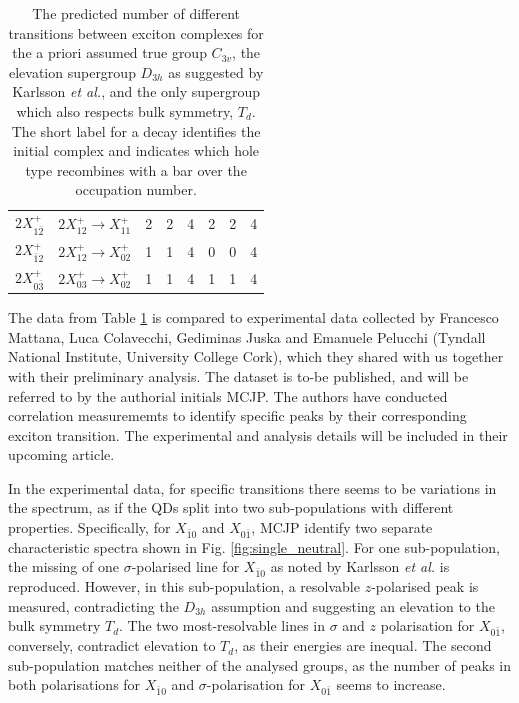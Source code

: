 \begin{table}
\begin{center}
\begin{tabular}{c c | c c c | c c c}
 $2X^+_{1\bar{2}}$ & $2X^+_{12}\to X^+_{11}$ & 2 & 2 & 4 & 2 & 2 & 4\\
 $2X^+_{\bar{1}2}$ & $2X^+_{12}\to X^+_{02}$ & 1 & 1 & 4 & 0 & 0 & 4\\
 $2X^+_{0\bar{3}}$ & $2X^+_{03}\to X^+_{02}$ & 1 & 1 & 4 & 1 & 1 & 4
\end{tabular}
\end{center}
\caption{The predicted number of different transitions between exciton complexes for the a priori assumed true group $C_{3v}$, the elevation supergroup $D_{3h}$ as suggested by Karlsson \textit{et al.}, and the only supergroup which also respects bulk symmetry, $T_d$. The short label for a decay identifies the initial complex and indicates which hole type recombines with a bar over the occupation number. \label{tab:predictions}}
\end{table}

The data from Table \ref{tab:predictions} is compared to experimental data collected by Francesco Mattana, Luca Colavecchi, Gediminas Juska and Emanuele Pelucchi (Tyndall National Institute, University College Cork), which they shared with us together with their preliminary analysis. The dataset is to-be published, and will be referred to by the authorial initials MCJP. The authors have conducted correlation measurememts to identify specific peaks by their corresponding exciton transition. The experimental and analysis details will be included in their upcoming article.

In the experimental data, for specific transitions there seems to be variations in the spectrum, as if the QDs split into two sub-populations with different properties. Specifically, for $X_{\bar{1}0}$ and $X_{0\bar{1}}$, MCJP identify two separate characteristic spectra shown in Fig. \ref{fig:single_neutral}. For one sub-population, the missing of one $\sigma$-polarised line for $X_{\bar{1}0}$ as noted by Karlsson \textit{et al.} is reproduced. However, in this sub-population, a resolvable $z$-polarised peak is measured, contradicting the $D_{3h}$ assumption and suggesting an elevation to the bulk symmetry $T_d$. The two most-resolvable lines in $\sigma$ and $z$ polarisation for $X_{0\bar{1}}$, conversely, contradict elevation to $T_d$, as their energies are inequal. The second sub-population matches neither of the analysed groups, as the number of peaks in both polarisations for $X_{\bar{1}0}$ and $\sigma$-polarisation for $X_{0\bar{1}}$ seems to increase.

